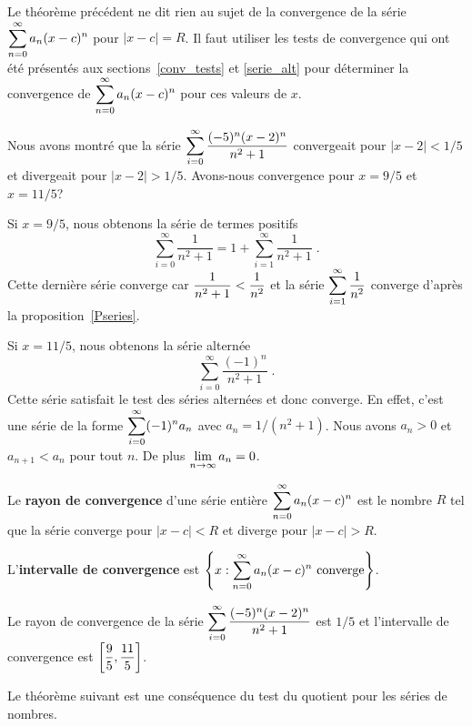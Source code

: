{\begin{rmk}
Le théorème précédent ne dit rien au sujet de la convergence de la série
$\displaystyle \sum_{n=0}^\infty a_n (x-c)^n$ pour $|x-c|=R$.  Il
faut utiliser les tests de convergence qui ont été présentés aux
sections~\ref{conv_tests} et \ref{serie_alt} pour déterminer la convergence
de $\displaystyle \sum_{n=0}^\infty a_n (x-c)^n$ pour ces valeurs de $x$.
\end{rmk}

\begin{egg} \label{entiere_eggS}
Nous avons montré que la série
$\displaystyle \sum_{i=0}^\infty \frac{(-5)^n(x-2)^n}{n^2+1}$ convergeait
pour $|x-2|<1/5$ et divergeait pour $|x-2|>1/5$.  Avons-nous convergence
pour $x=9/5$ et $x=11/5$?

Si $x=9/5$, nous obtenons la série de termes positifs
\[
\sum_{i=0}^\infty \frac{1}{n^2+1} = 1 + \sum_{i=1}^\infty \frac{1}{n^2+1} \; .
\]
Cette dernière série converge car
$\displaystyle \frac{1}{n^2+1} < \frac{1}{n^2}$ et la série
$\displaystyle \sum_{i=1}^\infty \frac{1}{n^2}$ converge d'après la
proposition~\ref{Pseries}.

Si $x=11/5$, nous obtenons la série alternée
\[
\sum_{i=0}^\infty \frac{(-1)^n}{n^2+1} \; .
\]
Cette série satisfait le test des séries alternées et donc converge.  En
effet, c'est une série de la forme
$\displaystyle \sum_{i=0}^\infty (-1)^n a_n$ avec $a_n = 1/(n^2+1)$.  Nous avons
$a_n>0$ et $a_{n+1} < a_n$ pour tout $n$.  De plus
$\displaystyle \lim_{n\rightarrow \infty} a_n = 0$.
\end{egg}

\begin{defn}
Le {\bfseries rayon de convergence} d'une série entière
$\displaystyle \sum_{n=0}^\infty a_n (x-c)^n$ est le nombre $R$ tel que la
série converge pour $|x-c|<R$ et diverge pour $|x-c|>R$.

L'{\bfseries intervalle de convergence} est
$\displaystyle \left\{x : \sum_{n=0}^\infty a_n (x-c)^n
\text{ converge} \right\}$.
\end{defn}

\begin{egg}
Le rayon de convergence de la série
$\displaystyle \sum_{i=0}^\infty \frac{(-5)^n(x-2)^n}{n^2+1}$ est
$1/5$ et l'intervalle de convergence est
$\displaystyle \left[\frac{9}{5} , \frac{11}{5}\right]$.
\end{egg}

Le théorème suivant est une conséquence du test du quotient pour les séries
de nombres.

}
